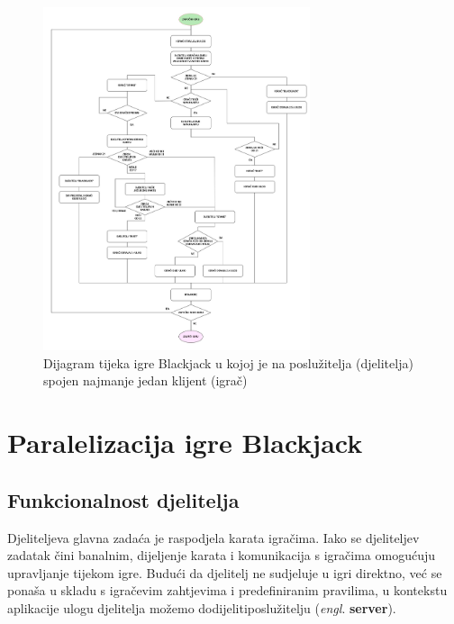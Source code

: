 \documentclass[conference]{IEEEtran}
\begin{document}
\begin{figure}[H]
\centering
\includegraphics[width=18.5pc]{flow-diagram.jpg}
\caption{Dijagram tijeka igre Blackjack u kojoj je na poslužitelja (djelitelja) spojen najmanje jedan klijent (igrač)}
\vspace{-5pt}
\end{figure}


\section{Paralelizacija igre Blackjack}

\subsection{Funkcionalnost djelitelja}

Djeliteljeva glavna zadaća je raspodjela karata igračima. Iako se djeliteljev zadatak čini banalnim, dijeljenje karata i komunikacija s igračima omogućuju upravljanje tijekom igre. Budući da djelitelj ne sudjeluje u igri direktno, već se ponaša u skladu s igračevim zahtjevima i predefiniranim pravilima, u kontekstu aplikacije ulogu djelitelja možemo dodijeliti\break poslužitelju (\textit{engl}. \textbf{server}).
\end{document}
